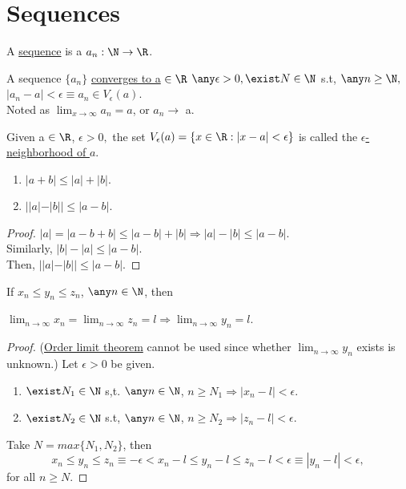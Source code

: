 \section{Sequences}
\begin{definition}
    A \uline{sequence} is a  $a_n: \N \rightarrow \R$.
\end{definition}
\begin{definition}
    A sequence $\{a_n\}$ \uline{converges to a} $\in \R$ \iff $\any \epsilon > 0, \exist N \in \N$ s.t, $\any n \geq \N,$ $|a_n - a| < \epsilon \equiv a_n \in V_\epsilon (a)$. \\
    Noted as $\lim_{x\to\infty} a_n = a$, or $a_n \rightarrow$ a.
\end{definition}
\begin{definition}
    Given a $\in \R$, $\epsilon > 0, $ the set $V_\epsilon (a) = \{ x \in \R : |x-a|<\epsilon\}$ is called the \uline{$\epsilon$-neighborhood of $a$}.
\end{definition}
\begin{theorem} \hspace{1em}
\begin{enumerate}
    \item $|a+b| \leq |a| + |b|$. 
    \item $||a|-|b|| \leq |a-b|$.
\end{enumerate}
\end{theorem}
\begin{proof}
$|a|=|a-b+b|\leq |a-b| + |b| \Longrightarrow |a|-|b| \leq |a-b|$.\\
Similarly, $|b|-|a|\leq |a-b|$.\\
Then, $||a|-|b|| \leq |a-b|$.
\end{proof}
\begin{theorem}
    If $x_n \leq y_n \leq z_n$, $\any n \in \N $, then
    
    $\lim_{n\to\infty} x_n = \lim_{n\to\infty} z_n = l \Rightarrow \lim_{n\to\infty} y_n = l$.
\end{theorem}
\begin{proof}
    (\uline{Order limit theorem} cannot be used since whether $\lim_{n\to\infty} y_n$ exists is unknown.)
    Let $\epsilon>0$ be given.
    \begin{enumerate}
        \item $\exist N_1 \in \N$ s,t. $\any n \in \N$, $n \geq N_1 \Rightarrow |x_n-l|<\epsilon$.
        \item $\exist N_2 \in \N$ s.t, $\any n \in \N$, $n \geq N_2 \Rightarrow |z_n-l|<\epsilon$.
    \end{enumerate}
    Take $N=max\{N_1, N_2\}$, then
    \[
        x_n \leq y_n \leq z_n \equiv -\epsilon < x_n - l \leq y_n -l \leq z_n - l <\epsilon \equiv |y_n - l| <\epsilon,
    \]
    for all $n\geq N$.
\end{proof}
